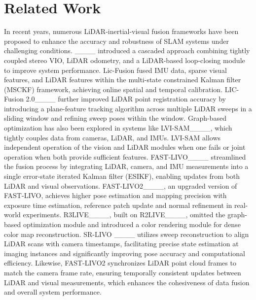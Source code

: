 \section{Related Work}
In recent years, numerous LiDAR-inertial-visual fusion frameworks have been proposed to enhance the accuracy and robustness of SLAM systems under challenging conditions. ____ introduced a cascaded approach combining tightly coupled stereo VIO, LiDAR odometry, and a LiDAR-based loop-closing module to improve system performance. Lic-Fusion fused IMU data, sparse visual features, and LiDAR features within the multi-state constrained Kalman filter (MSCKF) framework, achieving online spatial and temporal calibration. LIC-Fusion 2.0____ further improved LiDAR point registration accuracy by introducing a plane-feature tracking algorithm across multiple LiDAR sweeps in a sliding window and refining sweep poses within the window. Graph-based optimization has also been explored in systems like LVI-SAM____, which tightly couples data from cameras, LiDAR, and IMUs. LVI-SAM allows independent operation of the vision and LiDAR modules when one fails or joint operation when both provide sufficient features. FAST-LIVO____ streamlined the fusion process by integrating LiDAR, camera, and IMU measurements into a single error-state iterated Kalman filter (ESIKF), enabling updates from both LiDAR and visual observations. FAST-LIVO2____, an upgraded version of FAST-LIVO, achieves higher pose estimation and mapping precision with exposure time estimation, reference patch update and normal refinement in real-world experiments. R3LIVE____, built on R2LIVE____, omitted the graph-based optimization module and introduced a color rendering module for dense color map reconstruction. SR-LIVO ____ utilizes sweep reconstruction to align LiDAR scans with camera timestamps, facilitating precise state estimation at imaging instances and significantly improving pose accuracy and computational efficiency. Likewise, FAST-LIVO2 synchronizes LiDAR point cloud frames to match the camera frame rate, ensuring temporally consistent updates between LiDAR and visual measurements, which enhances the cohesiveness of data fusion and overall system performance. 

